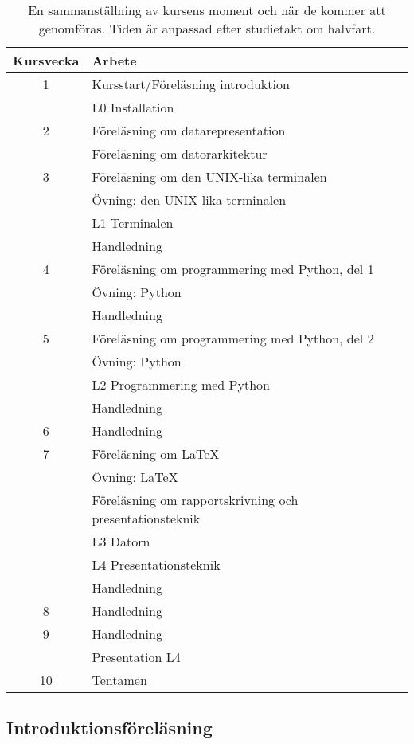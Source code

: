 \documentclass[a4paper,logo]{miunart}
\begin{document}
\begin{table}
  \centering
  \begin{tabular}{cp{9cm}}
    \textbf{Kursvecka}	& \textbf{Arbete} \\
    \toprule
    1
    & Kursstart/Föreläsning introduktion \\
    & L0 Installation \\
    \midrule
    2
    & Föreläsning om datarepresentation \\
    & Föreläsning om datorarkitektur \\
    \midrule
    3
    & Föreläsning om den UNIX-lika terminalen \\
    & Övning: den UNIX-lika terminalen \\
    & L1 Terminalen \\
    & Handledning \\
    \midrule
    4
    & Föreläsning om programmering med Python, del 1 \\
    & Övning: Python \\
    & Handledning \\
    \midrule
    5
    & Föreläsning om programmering med Python, del 2 \\
    & Övning: Python \\
    & L2 Programmering med Python \\
    & Handledning \\
    \midrule
    6
    & Handledning \\
    \midrule
    7
    & Föreläsning om LaTeX \\
    & Övning: LaTeX \\
    & Föreläsning om rapportskrivning och presentationsteknik \\
    & L3 Datorn \\
    & L4 Presentationsteknik \\
    & Handledning \\
    \midrule
    8
    & Handledning \\
    \midrule
    9
    & Handledning \\
    & Presentation L4 \\
    \midrule
    10
    & Tentamen \\
    \bottomrule
  \end{tabular}
  \caption{En sammanställning av kursens moment och när de kommer att 
    genomföras.
  Tiden är anpassad efter studietakt om halvfart.}
  \label{tbl:schema}
\end{table}

\subsection{Introduktionsföreläsning}

\end{document}
